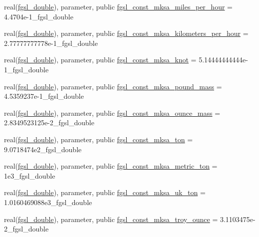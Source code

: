 \begin{DoxyCompactItemize}
\item 
real(\hyperlink{namespacefgsl_a9af5113378e0f000eb479d3f90196ddf}{fgsl\+\_\+double}), parameter, public \hyperlink{namespacefgsl_a66a4e29fec2be328384363b6a5b3efcd}{fgsl\+\_\+const\+\_\+mksa\+\_\+miles\+\_\+per\+\_\+hour} = 4.\+4704e-\/1\+\_\+fgsl\+\_\+double
\item 
real(\hyperlink{namespacefgsl_a9af5113378e0f000eb479d3f90196ddf}{fgsl\+\_\+double}), parameter, public \hyperlink{namespacefgsl_ae0c1239a6941272700558b0eaf053137}{fgsl\+\_\+const\+\_\+mksa\+\_\+kilometers\+\_\+per\+\_\+hour} = 2.\+77777777778e-\/1\+\_\+fgsl\+\_\+double
\item 
real(\hyperlink{namespacefgsl_a9af5113378e0f000eb479d3f90196ddf}{fgsl\+\_\+double}), parameter, public \hyperlink{namespacefgsl_a36e83219d4dc03eaba28ee2ee6636c56}{fgsl\+\_\+const\+\_\+mksa\+\_\+knot} = 5.\+14444444444e-\/1\+\_\+fgsl\+\_\+double
\item 
real(\hyperlink{namespacefgsl_a9af5113378e0f000eb479d3f90196ddf}{fgsl\+\_\+double}), parameter, public \hyperlink{namespacefgsl_ad3cb7ad76502d5665ed74c2306e2b5f2}{fgsl\+\_\+const\+\_\+mksa\+\_\+pound\+\_\+mass} = 4.\+5359237e-\/1\+\_\+fgsl\+\_\+double
\item 
real(\hyperlink{namespacefgsl_a9af5113378e0f000eb479d3f90196ddf}{fgsl\+\_\+double}), parameter, public \hyperlink{namespacefgsl_ad41b90538ca94b0ba552ed733d732c4b}{fgsl\+\_\+const\+\_\+mksa\+\_\+ounce\+\_\+mass} = 2.\+8349523125e-\/2\+\_\+fgsl\+\_\+double
\item 
real(\hyperlink{namespacefgsl_a9af5113378e0f000eb479d3f90196ddf}{fgsl\+\_\+double}), parameter, public \hyperlink{namespacefgsl_a28b9223526d6d5565fda3d778045fee0}{fgsl\+\_\+const\+\_\+mksa\+\_\+ton} = 9.\+0718474e2\+\_\+fgsl\+\_\+double
\item 
real(\hyperlink{namespacefgsl_a9af5113378e0f000eb479d3f90196ddf}{fgsl\+\_\+double}), parameter, public \hyperlink{namespacefgsl_a0d771fd3ef9d093957328b9555c6a604}{fgsl\+\_\+const\+\_\+mksa\+\_\+metric\+\_\+ton} = 1e3\+\_\+fgsl\+\_\+double
\item 
real(\hyperlink{namespacefgsl_a9af5113378e0f000eb479d3f90196ddf}{fgsl\+\_\+double}), parameter, public \hyperlink{namespacefgsl_a3eea842ca98526b2c06b85da367b7579}{fgsl\+\_\+const\+\_\+mksa\+\_\+uk\+\_\+ton} = 1.\+0160469088e3\+\_\+fgsl\+\_\+double
\item 
real(\hyperlink{namespacefgsl_a9af5113378e0f000eb479d3f90196ddf}{fgsl\+\_\+double}), parameter, public \hyperlink{namespacefgsl_a7046241db07bad6371b685e812c9d177}{fgsl\+\_\+const\+\_\+mksa\+\_\+troy\+\_\+ounce} = 3.\+1103475e-\/2\+\_\+fgsl\+\_\+double

\end{DoxyCompactItemize}
